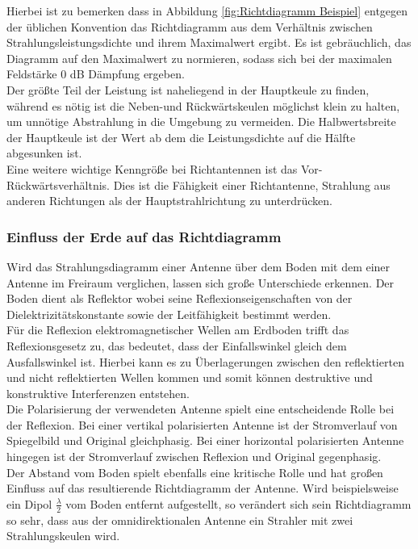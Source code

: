 Hierbei ist zu bemerken dass in Abbildung \ref{fig:Richtdiagramm Beispiel} entgegen der üblichen Konvention das Richtdiagramm aus dem Verhältnis zwischen Strahlungsleistungsdichte und ihrem Maximalwert ergibt. Es ist gebräuchlich, das Diagramm auf den Maximalwert zu normieren, sodass sich bei der maximalen Feldstärke 0 dB Dämpfung ergeben.\\

Der größte Teil der Leistung ist naheliegend in der Hauptkeule zu finden, während es nötig ist die Neben-und Rückwärtskeulen möglichst klein zu halten, um unnötige Abstrahlung in die Umgebung zu vermeiden. Die Halbwertsbreite der Hauptkeule ist der Wert ab dem die Leistungsdichte auf die Hälfte abgesunken ist.\\

Eine weitere wichtige Kenngröße bei Richtantennen ist das Vor-Rückwärtsverhältnis. Dies ist die Fähigkeit einer Richtantenne, Strahlung aus anderen Richtungen als der Hauptstrahlrichtung zu unterdrücken.

\subsubsection{Einfluss der Erde auf das Richtdiagramm}
Wird das Strahlungsdiagramm einer Antenne über dem Boden mit dem einer Antenne im Freiraum verglichen, lassen sich große Unterschiede erkennen. Der Boden dient als Reflektor wobei seine Reflexionseigenschaften von der Dielektrizitätskonstante sowie der Leitfähigkeit bestimmt werden.\\

Für die Reflexion elektromagnetischer Wellen am Erdboden trifft das Reflexionsgesetz zu, das bedeutet, dass der Einfallswinkel gleich dem Ausfallswinkel ist. Hierbei kann es zu Überlagerungen zwischen den reflektierten und nicht reflektierten Wellen kommen und somit können destruktive und konstruktive Interferenzen entstehen.\\

Die Polarisierung der verwendeten Antenne spielt eine entscheidende Rolle bei der Reflexion. Bei einer vertikal polarisierten Antenne ist der Stromverlauf von Spiegelbild und Original gleichphasig. Bei einer horizontal polarisierten Antenne hingegen ist der Stromverlauf zwischen Reflexion und Original gegenphasig.\\

Der Abstand vom Boden spielt ebenfalls eine kritische Rolle und hat großen Einfluss auf das resultierende Richtdiagramm der Antenne. Wird beispielsweise ein Dipol $\frac{\lambda}{2}$ vom Boden entfernt aufgestellt, so verändert sich sein Richtdiagramm so sehr, dass aus der omnidirektionalen Antenne ein Strahler mit zwei Strahlungskeulen wird. 

